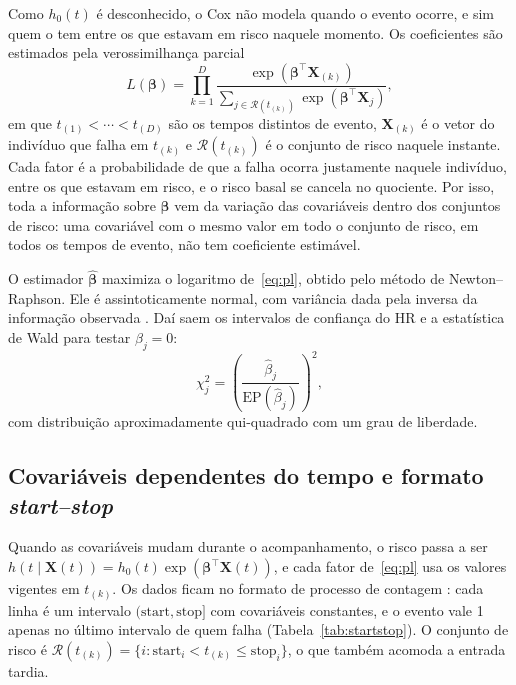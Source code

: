 Como $h_0(t)$ é desconhecido, o Cox não modela quando o evento ocorre, e sim quem o tem entre os que estavam em risco naquele momento. Os coeficientes são estimados pela verossimilhança parcial
\begin{equation}
    L(\boldsymbol{\beta})
    = \prod_{k=1}^{D}
      \frac{\exp\!\left(\boldsymbol{\beta}^{\top}\mathbf{X}_{(k)}\right)}
           {\displaystyle\sum_{j \in \mathcal{R}(t_{(k)})}
            \exp\!\left(\boldsymbol{\beta}^{\top}\mathbf{X}_j\right)},
    \label{eq:pl}
\end{equation}
em que $t_{(1)} < \cdots < t_{(D)}$ são os tempos distintos de evento, $\mathbf{X}_{(k)}$ é o vetor do indivíduo que falha em $t_{(k)}$ e $\mathcal{R}(t_{(k)})$ é o conjunto de risco naquele instante. Cada fator é a probabilidade de que a falha ocorra justamente naquele indivíduo, entre os que estavam em risco, e o risco basal se cancela no quociente. Por isso, toda a informação sobre $\boldsymbol{\beta}$ vem da variação das covariáveis dentro dos conjuntos de risco: uma covariável com o mesmo valor em todo o conjunto de risco, em todos os tempos de evento, não tem coeficiente estimável.

O estimador $\hat{\boldsymbol{\beta}}$ maximiza o logaritmo de~\eqref{eq:pl}, obtido pelo método de Newton--Raphson. Ele é assintoticamente normal, com variância dada pela inversa da informação observada \citep{andersen1982}. Daí saem os intervalos de confiança do HR e a estatística de Wald para testar $\beta_j = 0$:
\begin{equation}
    \chi^2_j = \left(\frac{\hat{\beta}_j}{\mathrm{EP}(\hat{\beta}_j)}\right)^{2},
    \label{eq:wald}
\end{equation}
com distribuição aproximadamente qui-quadrado com um grau de liberdade.

    \subsection{Covariáveis dependentes do tempo e formato \textit{start--stop}}
    \label{subsec:cox_vdt}

Quando as covariáveis mudam durante o acompanhamento, o risco passa a ser $h(t \mid \mathbf{X}(t)) = h_0(t)\exp(\boldsymbol{\beta}^{\top}\mathbf{X}(t))$, e cada fator de~\eqref{eq:pl} usa os valores vigentes em $t_{(k)}$. Os dados ficam no formato de processo de contagem \citep{andersen1982}: cada linha é um intervalo $(\text{start}, \text{stop}]$ com covariáveis constantes, e o evento vale 1 apenas no último intervalo de quem falha (Tabela~\ref{tab:startstop}). O conjunto de risco é $\mathcal{R}(t_{(k)}) = \{i : \text{start}_i < t_{(k)} \leq \text{stop}_i\}$, o que também acomoda a entrada tardia.

